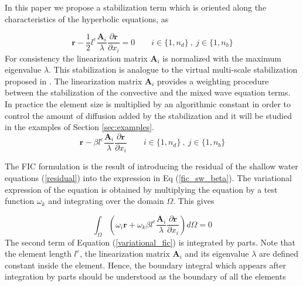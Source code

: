 \documentclass[a4paper,12pt]{article}
\newcommand{\pder}[2]{\frac{\partial#1}{\partial#2}}
\begin{document}
In this paper we propose a stabilization term which is oriented along the characteristics of the hyperbolic equations, as

\begin{equation} \label{fic_sw}
\mathbf{r} - \frac{1}{2}l^e\frac{\mathbf{A}_i}{\lambda}\pder{\mathbf{r}}{x_i} = 0
    \qquad i\in\{1,n_d\} \ ,\ j\in\{1,n_b\}
\end{equation}
For consistency the linearization matrix $\mathbf{A}_i$ is normalized with the maximum eigenvalue $\lambda$. This stabilization is analogue to the virtual multi-scale stabilization proposed in \cite{codina2008b}. The linearization matrix $\mathbf{A}_i$ provides a weighting procedure between the stabilization of the convective and the mixed wave equation terms. In practice the element size is multiplied by an algorithmic constant in order to control the amount of diffusion added by the stabilization and it will be studied in the examples of Section \ref{sec:examples}.
\begin{equation} \label{fic_sw_beta}
\mathbf{r} - \beta l^e\frac{\mathbf{A}_i}{\lambda}\pder{\mathbf{r}}{x_i}
    \qquad i\in\{1,n_d\} \ ,\ j\in\{1,n_b\}
\end{equation}

The FIC formulation is the result of introducing the residual of the shallow water equations (\ref{residual}) into the expression in Eq (\ref{fic_sw_beta}). The variational expression of the equation is obtained by multiplying the equation by a test function $\omega_k$ and integrating over the domain $\Omega$. This gives

\begin{equation} \label{variational_fic}
\int_\Omega \left(
    \omega_i \mathbf{r} + \omega_k \beta l^e\frac{\mathbf{A}_i}{\lambda}\pder{\mathbf{r}}{x_i}
\right) d\Omega = 0
\end{equation}
The second term of Equation (\ref{variational_fic}) is integrated by parts. Note that the element length $l^e$, the linearization matrix $\mathbf{A}_i$ and its eigenvalue $\lambda$ are defined constant inside the element. Hence, the boundary integral which appears after integration by parts should be understood as the boundary of all the elements
\end{document}
